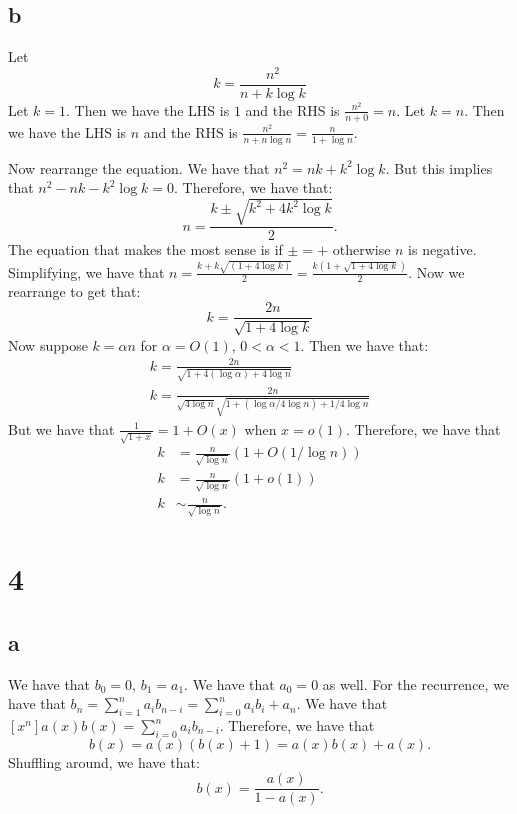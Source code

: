 \documentclass[]{article}
\begin{document}
\subsection{b}
Let
\begin{equation}
	k = \frac{n^2}{n + k \log k}
\end{equation}
Let $k = 1$. Then we have the LHS is $1$ and the RHS is $\frac{n^2}{n + 0} = n$. Let $k = n$. Then we have the LHS is $n$ and the RHS is $\frac{n^2}{n + n \log n} = \frac{n}{1 + \log n}$.

Now rearrange the equation. We have that $n^2 = nk + k^2 \log k$. But this implies that $n^2 - nk - k^2 \log k = 0$. Therefore, we have that:
\begin{equation}
	n = \frac{k \pm \sqrt{k^2 + 4 k^2 \log k}}{2}.
\end{equation}
The equation that makes the most sense is if $\pm = +$ otherwise $n$ is negative. 
Simplifying, we have that $n = \frac{k + k \sqrt{(1 + 4\log k)}}{2} = \frac{k (1 + \sqrt{1 + 4\log k})}{2}$. Now we rearrange to get that:
\begin{equation}
	k = \frac{2n}{\sqrt{1 + 4\log k}}
\end{equation}
Now suppose $k = \alpha n$ for $\alpha = O(1)$, $0 < \alpha < 1$. 
Then we have that:
\begin{align*}
	k = \frac{2n}{\sqrt{1 + 4(\log \alpha) + 4\log n}}\\
	k = \frac{2n}{\sqrt{4\log n} \sqrt{1 + (\log \alpha/4\log n) + 1/4\log n}}
\end{align*}
But we have that $\frac{1}{\sqrt{1 + x}} = 1 + O(x)$ when $x = o(1)$. Therefore, we have that
\begin{align*}
	k &= \frac{n}{\sqrt{\log n}} \left( 1 + O(1/ \log n) \right)\\
	k &=\frac{n}{\sqrt{\log n}} (1 + o(1))\\
	k &\sim \frac{n}{\sqrt{\log n}}.
\end{align*}

\section{4}
\subsection{a}
We have that $b_0 = 0$, $b_1 = a_1$. We have that $a_0 = 0$ as well. For the recurrence, we have that $b_n = \sum_{i = 1}^{n} a_i b_{n - i} = \sum_{i = 0}^{n} a_i b_i + a_n$. We have that $[x^n]a(x) b(x) = \sum_{i = 0}^{n} a_i b_{n - i}$.  Therefore, we have that
\begin{equation}
	b(x) =  a(x)(b(x) + 1) = a(x) b(x) + a(x). 
\end{equation}
Shuffling around, we have that:
\begin{equation}
	b(x) = \frac{a(x)}{1 - a(x)}.
\end{equation}
\end{document}
